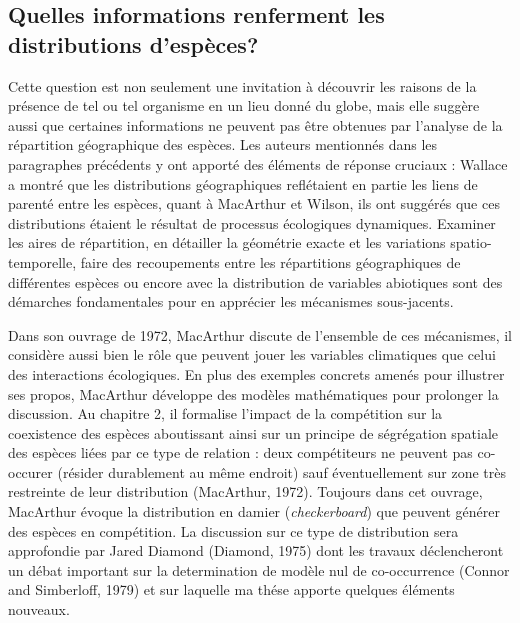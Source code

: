 \subsection*{Quelles informations renferment les distributions
d'espèces?}\label{quelles-informations-renferment-les-distributions-despuxe8ces}

Cette question est non seulement une invitation à découvrir les raisons
de la présence de tel ou tel organisme en un lieu donné du globe, mais
elle suggère aussi que certaines informations ne peuvent pas être
obtenues par l'analyse de la répartition géographique des espèces. Les
auteurs mentionnés dans les paragraphes précédents y ont apporté des
éléments de réponse cruciaux : Wallace a montré que les distributions
géographiques reflétaient en partie les liens de parenté entre les
espèces, quant à MacArthur et Wilson, ils ont suggérés que ces
distributions étaient le résultat de processus écologiques dynamiques.
Examiner les aires de répartition, en détailler la géométrie exacte et
les variations spatio-temporelle, faire des recoupements entre les
répartitions géographiques de différentes espèces ou encore avec la
distribution de variables abiotiques sont des démarches fondamentales
pour en apprécier les mécanismes sous-jacents.

Dans son ouvrage de 1972, MacArthur discute de l'ensemble de ces
mécanismes, il considère aussi bien le rôle que peuvent jouer les
variables climatiques que celui des interactions écologiques. En plus
des exemples concrets amenés pour illustrer ses propos, MacArthur
développe des modèles mathématiques pour prolonger la discussion. Au
chapitre 2, il formalise l'impact de la compétition sur la coexistence
des espèces aboutissant ainsi sur un principe de ségrégation spatiale
des espèces liées par ce type de relation : deux compétiteurs ne peuvent
pas co-occurer (résider durablement au même endroit) sauf éventuellement
sur zone très restreinte de leur distribution (MacArthur, 1972).
Toujours dans cet ouvrage, MacArthur évoque la distribution en damier
(\emph{checkerboard}) que peuvent générer des espèces en compétition. La
discussion sur ce type de distribution sera approfondie par Jared
Diamond (Diamond, 1975) dont les travaux déclencheront un débat
important sur la determination de modèle nul de co-occurrence (Connor
and Simberloff, 1979) et sur laquelle ma thése apporte quelques éléments
nouveaux.

